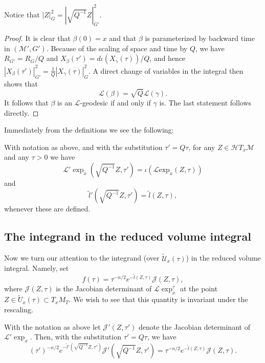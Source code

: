 \begin{remark}\label{rem:rescaling-norm-identity}
Notice that $|Z|_G^2=|\sqrt{Q^{-1}}Z|^2_{G'}$.
\end{remark}

\begin{proof}
\sketch
It is clear that $\beta(0)=x$ and that $\beta$ is parameterized by
backward time in $({\mathcal M}',G')$. Because of the scaling of
space and time by $Q$, we have $R_{G'}=R_G/Q$ and
$X_\beta(\tau')=d\iota(X_\gamma(\tau))/Q$, and hence
$|X_\beta(\tau')|^2_{G'}=\frac{1}{Q}|X_\gamma(\tau)|^2_{G}$. A
direct change of variables in the integral then shows that
$${\mathcal L}(\beta)=\sqrt{Q}{\mathcal L}(\gamma).$$
It follows that $\beta$ is an ${\mathcal L}$-geodesic if and only if
$\gamma$ is. The last statement follows directly.
\end{proof}

Immediately from the definitions we see the following:

\begin{corollary}\label{cor:l-exponential-rescaling-identity}
\label{COR}
With notation as above, and with the substitution $\tau'=Q\tau$, for
any $Z\in {\mathcal H}T_x{\mathcal M}$ and any $\tau>0$ we have
$${\mathcal
L}'\exp_x(\sqrt{Q^{-1}}Z,\tau')=\iota({\mathcal L}\mathrm{exp}_x(Z,\tau))$$ and
$$ \tilde l'(\sqrt{Q^{-1}}Z,\tau')=\tilde l(Z,\tau),$$
whenever these are defined.
\end{corollary}




\subsection{The integrand in the reduced volume integral}


Now we turn our attention to the integrand (over $\widetilde {\mathcal U}_x(\tau)$) in the
reduced volume integral. Namely, set
$$f(\tau)=\tau^{-n/2}e^{-\tilde l(Z,\tau)}{\mathcal J}(Z,\tau),$$
where ${\mathcal J}(Z,\tau)$ is the Jacobian
determinant of ${\mathcal L}\exp_x^\tau$ at the point $Z\in \widetilde
U_x(\tau)\subset T_xM_T$. We wish to see that this quantity is invariant under
the rescaling.

\begin{lemma}\label{lem:reduced-volume-integrand-scale-invariance}
\label{Qformula}
With the notation as above let ${\mathcal J}'(Z,\tau')$ denote the
Jacobian determinant of  ${\mathcal L}'\exp_x$. Then, with the
substitution $\tau'=Q\tau$, we have
$$(\tau')^{-n/2}e^{-\tilde l'(\sqrt{Q^{-1}}Z,\tau')}{\mathcal J}'(\sqrt{Q^{-1}}Z,\tau')=
\tau^{-n/2}e^{-\tilde l(Z,\tau)}{\mathcal J}(Z,\tau).$$
\end{lemma}


